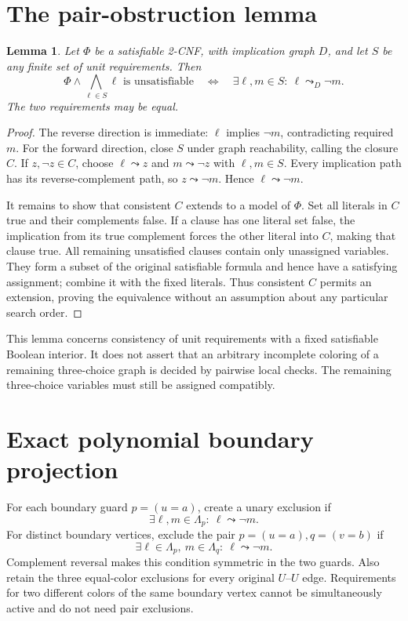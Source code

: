 \documentclass[11pt]{article}
\newtheorem{lemma}[theorem]{Lemma}
\begin{document}
\section{The pair-obstruction lemma}
\begin{lemma}\label{lem:units}
Let $\Phi$ be a satisfiable 2-CNF, with implication graph $D$, and let $S$
be any finite set of unit requirements. Then
\[
 \Phi\land\bigwedge_{\ell\in S}\ell\text{ is unsatisfiable}
 \quad\Longleftrightarrow\quad
 \exists\ell,m\in S:\ \ell\leadsto_D\neg m.
\]
The two requirements may be equal.
\end{lemma}
\begin{proof}
The reverse direction is immediate: $\ell$ implies $\neg m$, contradicting
required $m$. For the forward direction, close $S$ under graph reachability,
calling the closure $C$. If $z,\neg z\in C$, choose
$\ell\leadsto z$ and $m\leadsto\neg z$ with $\ell,m\in S$.
Every implication path has its reverse-complement path, so
$z\leadsto\neg m$. Hence $\ell\leadsto\neg m$.

It remains to show that consistent $C$ extends to a model of $\Phi$.
Set all literals in $C$ true and their complements false. If a clause has
one literal set false, the implication from its true complement forces
the other literal into $C$, making that clause true. All remaining
unsatisfied clauses contain only unassigned variables. They form a subset
of the original satisfiable formula and hence have a satisfying assignment;
combine it with the fixed literals. Thus consistent $C$ permits an extension,
proving the equivalence without an assumption about any particular search order.
\end{proof}

This lemma concerns consistency of unit requirements with a fixed satisfiable
Boolean interior. It does not assert that an arbitrary incomplete coloring
of a remaining three-choice graph is decided by pairwise local checks.
The remaining three-choice variables must still be assigned compatibly.

\section{Exact polynomial boundary projection}
For each boundary guard $p=(u=a)$, create a unary exclusion if
\[
 \exists\ell,m\in\Lambda_p:\ \ell\leadsto\neg m.
\]
For distinct boundary vertices, exclude the pair $p=(u=a),q=(v=b)$ if
\[
 \exists\ell\in\Lambda_p,\ m\in\Lambda_q:\ \ell\leadsto\neg m.
\]
Complement reversal makes this condition symmetric in the two guards.
Also retain the three equal-color exclusions for every original $U$--$U$
edge. Requirements for two different colors of the same boundary vertex
cannot be simultaneously active and do not need pair exclusions.
\end{document}
